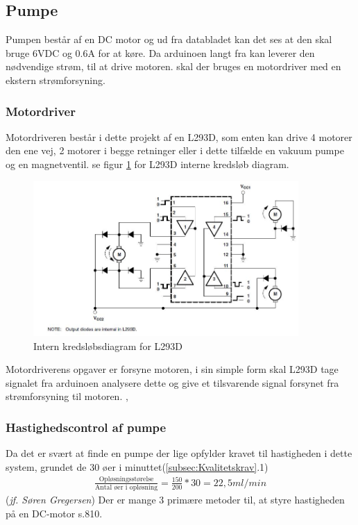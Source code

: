  \subsection{Pumpe}
 Pumpen består af en DC motor og ud fra databladet kan det ses at den skal bruge 6VDC og 0.6A for at køre. Da arduinoen langt fra kan leverer den nødvendige strøm, til at drive motoren. skal der bruges en motordriver med en ekstern strømforsyning.
 \subsubsection{Motordriver}
 Motordriveren består i dette projekt af en L293D, som enten kan drive 4 motorer den ene vej, 2 motorer i begge retninger eller i dette tilfælde en vakuum pumpe og en magnetventil. se figur \ref{fig:motordriverdiagram} for L293D interne kredsløb diagram. 
   \begin{figure}[H]
	\centering
	\includegraphics[width=0.9\textwidth]{billeder/Hardware/diagrammer/L293intern.JPG}
	\caption{Intern kredsløbsdiagram for L293D}
	\label{fig:motordriverdiagram}
\end{figure}
Motordriverens opgaver er forsyne motoren, i sin simple form skal L293D tage signalet fra arduinoen analysere dette og give et tilsvarende signal forsynet fra strømforsyning til motoren. ,
\subsubsection{Hastighedscontrol af pumpe}
Da det er svært at finde en pumpe der lige opfylder kravet til hastigheden i dette system, grundet de 30 øer i minuttet(\ref{subsec:Kvalitetskrav}.1)
\begin{align}
\frac{\text{Opløsningsstørelse}}{\text{Antal øer i opløsning}} = \frac{150}{200}*30 = 22,5ml/min
\label{eg:ohastighed}
\end{align}(\textit{jf. Søren Gregersen})
Der er mange 3 primære metoder til, at styre hastigheden på en DC-motor \citep{ELengbog}s.810.

